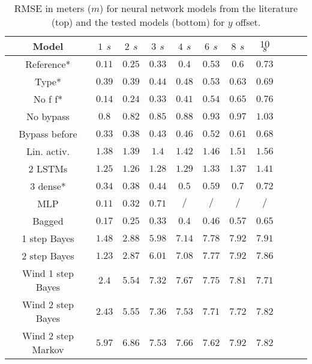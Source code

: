 \documentclass[preprint,12pt]{elsarticle}
\begin{document}
\begin{table}[!ht]
	\centering
    \begin{tabular}{|c|c|c|c|c|c|c|c|c|c|c|}
        \hline
        Model & $1$ $s$ & $2$ $s$ & $3$ $s$ & $4$ $s$ & $6$ $s$ & $8$ $s$ & $10$ $s$ \\ \hline
        Reference* & $\mathbf{0.11}$ & $0.25$ & $\mathbf{0.33}$ & $\mathbf{0.4}$ & $0.53$ & $0.6$ & $0.73$ \\ \hline
        Type* & $0.39$ & $0.39$ & $0.44$ & $0.48$ & $0.53$ & $0.63$ & $0.69$ \\ \hline
        No f f* & $0.14$ & $\mathbf{0.24}$ & $0.33$ & $0.41$ & $0.54$ & $0.65$ & $0.76$ \\ \hline
        No bypass & $0.8$ & $0.82$ & $0.85$ & $0.88$ & $0.93$ & $0.97$ & $1.03$ \\ \hline
        Bypass before & $0.33$ & $0.38$ & $0.43$ & $0.46$ & $0.52$ & $0.61$ & $0.68$ \\ \hline
        Lin. activ. & $1.38$ & $1.39$ & $1.4$ & $1.42$ & $1.46$ & $1.51$ & $1.56$ \\ \hline
        2 LSTMs & $1.25$ & $1.26$ & $1.28$ & $1.29$ & $1.33$ & $1.37$ & $1.41$ \\ \hline
        3 dense* & $0.34$ & $0.38$ & $0.44$ & $0.5$ & $0.59$ & $0.7$ & $0.72$ \\ \hline
        MLP \cite{liu2014vehicle} & $0.11$ & $0.32$ & $0.71$ & $/$ & $/$ & $/$ & $/$ \\ \hline
        Bagged & $0.17$ & $0.25$ & $0.33$ & $0.4$ & $\mathbf{0.46}$ & $\mathbf{0.57}$ & $\mathbf{0.65}$ \\ \hline
        1 step Bayes & $1.48$ & $2.88$ & $5.98$ & $7.14$ & $7.78$ & $7.92$ & $7.91$ \\ \hline
        2 step Bayes & $1.23$ & $2.87$ & $6.01$ & $7.08$ & $7.77$ & $7.92$ & $7.86$ \\ \hline
        Wind 1 step Bayes & $2.4$ & $5.54$ & $7.32$ & $7.67$ & $7.75$ & $7.81$ & $7.71$ \\ \hline
        Wind 2 step Bayes & $2.43$ & $5.55$ & $7.36$ & $7.53$ & $7.71$ & $7.72$ & $7.82$ \\ \hline
        Wind 2 step Markov & $5.97$ & $6.86$ & $7.53$ & $7.66$ & $7.62$ & $7.92$ & $7.82$ \\ \hline
    \end{tabular}
    \caption{RMSE in meters ($m$) for neural network models from the literature \cite{altche2017lstm, liu2014vehicle} (top) and the tested models (bottom) for $y$ offset.}
    \label{tab:lateral_position}
\end{table}
\end{document}
